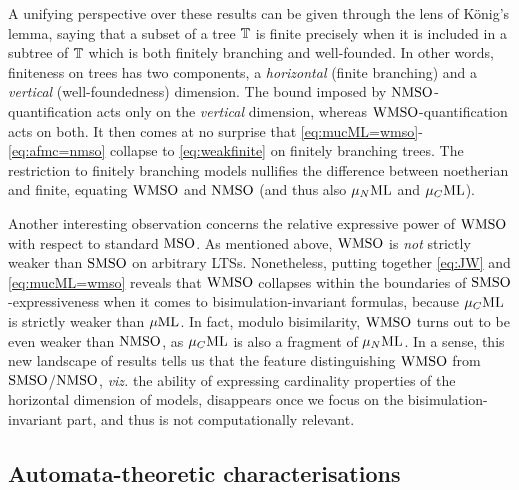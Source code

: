 A unifying perspective over these results can be given through the lens of
K\"onig's lemma, saying that a subset of a tree $\mathbb{T}$ is finite precisely 
when it is included in a subtree of $\mathbb{T}$ which is both finitely branching 
and well-founded. In other words, finiteness on trees has two components, a
\emph{horizontal} (finite branching) and a \emph{vertical} (well-foundedness)
dimension. 
The bound imposed by $\mathrm{NMSO}$-quantification acts only on the \emph{vertical}
dimension, whereas $\mathrm{WMSO}$-quantification acts on both. 
It then comes at no surprise that \eqref{eq:mucML=wmso}-\eqref{eq:afmc=nmso}
collapse to \eqref{eq:weakfinite} on finitely branching trees.
The restriction to finitely branching models nullifies the difference between
noetherian and finite, equating $\mathrm{WMSO}$ and $\mathrm{NMSO}$ (and thus also $\mu_{N}\mathrm{ML}$ and
$\mu_{C}\mathrm{ML}$).


Another interesting observation concerns the relative expressive power of 
$\mathrm{WMSO}$ with respect to standard $\mathrm{MSO}$. 
As mentioned above, $\mathrm{WMSO}$ is \emph{not} strictly weaker than $\mathrm{SMSO}$ on 
arbitrary LTSs. 
Nonetheless, putting together \eqref{eq:JW} and \eqref{eq:mucML=wmso} reveals 
that $\mathrm{WMSO}$ collapses within the boundaries of $\mathrm{SMSO}$-expressiveness when it 
comes to bisimulation-invariant formulas, because $\mu_{C}\mathrm{ML}$ is strictly weaker
than $\mu\mathrm{ML}$. 
In fact, modulo bisimilarity, $\mathrm{WMSO}$ turns out to be even weaker than $\mathrm{NMSO}$, 
as $\mu_{C}\mathrm{ML}$ is also a fragment of $\mu_{N}\mathrm{ML}$. 
In a sense, this new landscape of results tells us that the feature 
distinguishing $\mathrm{WMSO}$ from $\mathrm{SMSO}$/$\mathrm{NMSO}$, \emph{viz.} the ability of 
expressing cardinality properties of the horizontal dimension of models, 
disappears once we focus on the bisimulation-invariant part, and thus is not
computationally relevant.

\subsection{Automata-theoretic characterisations}

